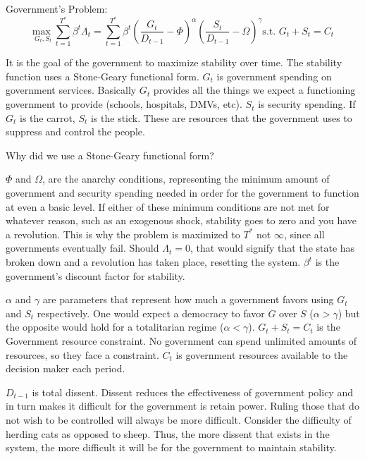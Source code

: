 \documentclass[12pt]{article}
\begin{document}
\begin{spacing}{1.5}
\noindent Government's Problem:
\begin{equation}
{\underset{G_t,S_t}{\text{max }}} \sum\limits_{t=1}^{T^*} \beta^t {\Lambda}_t = \sum\limits_{t=1}^{T^*} \beta^t\left(\frac{G_t}{D_{t-1}}-\Phi\right)^\alpha \left(\frac{S_t}{D_{t-1}}-\Omega\right)^\gamma   \text{s.t. } G_t+S_t=C_t
\end{equation}

It is the goal of the government to maximize stability over time. The stability function uses a Stone-Geary functional form. $G_t$ is government spending on government services. Basically $G_t$ provides all the things we expect a functioning government to provide (schools, hospitals, DMVs, etc). $S_t$ is security spending. If $G_t$ is the carrot, $S_t$ is the stick. These are resources that the government uses to suppress and control the people. 

Why did we use a Stone-Geary functional form? 

$\Phi$ and $\Omega$, are the anarchy conditions, representing the minimum amount of government and security spending needed in order for the government to function at even a basic level. If either of these minimum conditions are not met for whatever reason, such as an exogenous shock, stability goes to zero and you have a revolution. This is why the problem is maximized to $T^*$ not $\infty$, since all governments eventually fail. Should $\Lambda_t=0$, that would signify that the state has broken down and a revolution has taken place, resetting the system. $\beta^t$ is the government's discount factor for stability. 

$\alpha$ and $\gamma $  are parameters that represent how much a government favors using $G_t$ and $S_t$ respectively. One would expect a democracy to favor $G$ over $S$ ($\alpha > \gamma$) but the opposite would hold for a totalitarian regime ($\alpha < \gamma $). $G_t+S_t=C_t$ is the Government resource constraint. No government can spend unlimited amounts of resources, so they face a constraint. $C_t$ is government resources available to the decision maker each period. 

$D_{t-1}$ is total dissent. Dissent reduces the effectiveness of government policy and in turn makes it difficult for the government is retain power. Ruling those that do not wish to be controlled will always be more difficult. Consider the difficulty of herding cats as opposed to sheep. Thus, the more dissent that exists in the system, the more difficult it will be for the government to maintain stability.  


\end{spacing}
\end{document}
